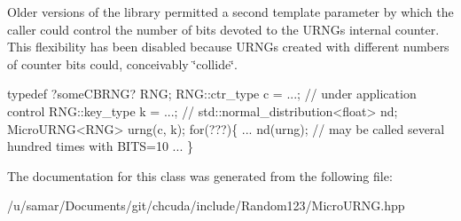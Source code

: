 Older versions of the library permitted a second template parameter by which the caller could control the number of bits devoted to the U\+R\+NG\textquotesingle{}s internal counter. This flexibility has been disabled because U\+R\+N\+Gs created with different numbers of counter bits could, conceivably \char`\"{}collide\char`\"{}.


\begin{DoxyCode}
\textcolor{keyword}{typedef} ?someCBRNG? RNG;
RNG::ctr\_type c = ...; \textcolor{comment}{// under application control}
RNG::key\_type k = ...; \textcolor{comment}{// }
std::normal\_distribution<float> nd;
MicroURNG<RNG> urng(c, k);
\textcolor{keywordflow}{for}(???)\{
  ...
  nd(urng);  \textcolor{comment}{// may be called several hundred times with BITS=10}
  ...
\}
\end{DoxyCode}
 

The documentation for this class was generated from the following file\+:\begin{DoxyCompactItemize}
\item 
/u/samar/\+Documents/git/chcuda/include/\+Random123/Micro\+U\+R\+N\+G.\+hpp\end{DoxyCompactItemize}
